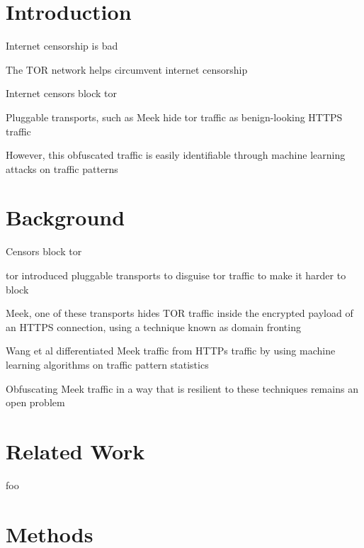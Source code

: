 \section{Introduction}

Internet censorship is bad

The TOR network helps circumvent internet censorship

Internet censors block tor

Pluggable transports, such as Meek hide tor traffic as benign-looking HTTPS traffic

However, this obfuscated traffic is easily identifiable through machine learning attacks on traffic patterns

\section{Background}

Censors block tor

tor introduced pluggable transports to disguise tor traffic to make it harder to block

Meek, one of these transports hides TOR traffic inside the encrypted payload of an HTTPS connection, using a technique known as domain fronting

Wang et al differentiated Meek traffic from HTTPs traffic by using machine learning algorithms on traffic pattern statistics

Obfuscating Meek traffic in a way that is resilient to these techniques remains an open problem


\section{Related Work}
foo
\section{Methods}

